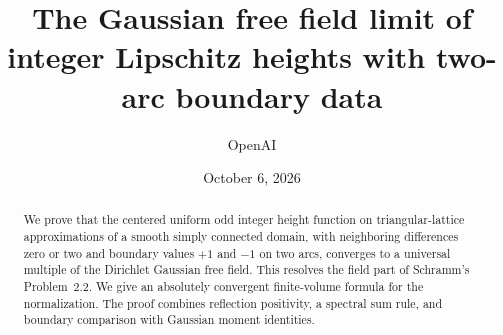 \documentclass[11pt]{article}
\title{The Gaussian free field limit of integer Lipschitz heights with two-arc boundary data}
\author{OpenAI}
\date{October 6, 2026}
\numberwithin{equation}{section}
\theoremstyle{definition}
\begin{document}
\maketitle
\begin{abstract}
We prove that the centered uniform odd integer height function on triangular-lattice approximations of a smooth simply connected domain, with neighboring differences zero or two and boundary values $+1$ and $-1$ on two arcs, converges to a universal multiple of the Dirichlet Gaussian free field. This resolves the field part of Schramm's Problem~2.2. We give an absolutely convergent finite-volume formula for the normalization. The proof combines reflection positivity, a spectral sum rule, and boundary comparison with Gaussian moment identities.
\end{abstract}
\tableofcontents












\end{document}
